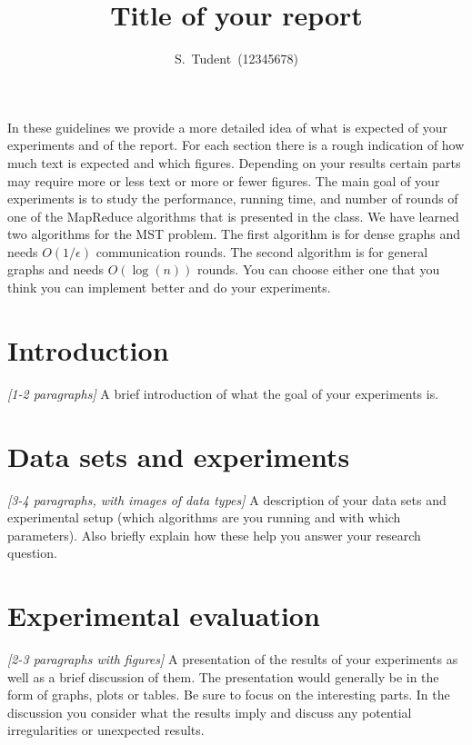 \documentclass[11pt]{article}
\title{Title of your report}
\author{S.~Tudent~(12345678)}
\date{}
\begin{document}
\maketitle

In these guidelines we provide a more detailed idea of what is expected of your experiments and of the report. 
For each section there is a rough indication of how much text is expected and which figures. 
Depending on your results certain parts may require more or less text or more or fewer figures. 
The main goal of your experiments is to study the performance, running time, and number of rounds 
of one of the MapReduce algorithms that is presented in the class. 
We have learned two algorithms for the MST problem. 
The first algorithm is for dense graphs and needs $O(1/\epsilon)$ communication rounds. 
The second algorithm is for general graphs and needs $O(\log(n))$ rounds. 
You can choose either one that you think you can  implement better and do your experiments. 


\section{Introduction}
\label{se:introduction}
\emph{[1-2 paragraphs]}
A brief introduction of what the goal of your experiments is.


\section{Data sets and experiments}
\label{se:algorithms}
\emph{[3-4 paragraphs, with images of data types]}
A description of your data sets and experimental setup (which algorithms are you running and with which parameters). Also briefly explain how these help you answer your research question.



\section{Experimental evaluation}
\label{se:evaluation}
\emph{[2-3 paragraphs with figures]}
A presentation of the results of your experiments as well as a brief discussion of them. 
The presentation would generally be in the form of graphs, plots or tables. 
Be sure to focus on the interesting parts. 
In the discussion you consider what the results imply and discuss any potential irregularities or unexpected results.
\end{document}
